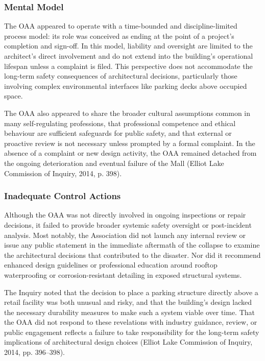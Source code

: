 \documentclass[12pt]{article}
\begin{document}
\subsubsection*{Mental Model}
The OAA appeared to operate with a time-bounded and discipline-limited process model: its role was conceived as ending at the point of a project’s completion and sign-off. In this model, liability and oversight are limited to the architect’s direct involvement and do not extend into the building’s operational lifespan unless a complaint is filed. This perspective does not accommodate the long-term safety consequences of architectural decisions, particularly those involving complex environmental interfaces like parking decks above occupied space.

The OAA also appeared to share the broader cultural assumptions common in many self-regulating professions, that professional competence and ethical behaviour are sufficient safeguards for public safety, and that external or proactive review is not necessary unless prompted by a formal complaint. In the absence of a complaint or new design activity, the OAA remained detached from the ongoing deterioration and eventual failure of the Mall (Elliot Lake Commission of Inquiry, 2014, p. 398).

\subsubsection*{Inadequate Control Actions}
Although the OAA was not directly involved in ongoing inspections or repair decisions, it failed to provide broader systemic safety oversight or post-incident analysis. Most notably, the Association did not launch any internal review or issue any public statement in the immediate aftermath of the collapse to examine the architectural decisions that contributed to the disaster. Nor did it recommend enhanced design guidelines or professional education around rooftop waterproofing or corrosion-resistant detailing in exposed structural systems.

The Inquiry noted that the decision to place a parking structure directly above a retail facility was both unusual and risky, and that the building’s design lacked the necessary durability measures to make such a system viable over time. That the OAA did not respond to these revelations with industry guidance, review, or public engagement reflects a failure to take responsibility for the long-term safety implications of architectural design choices (Elliot Lake Commission of Inquiry, 2014, pp. 396–398).
\end{document}
